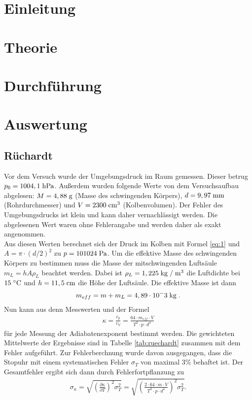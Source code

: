 \documentclass[12pt, a4paper, twoside]{scrartcl}
\begin{document}

\cleardoublepage
\tableofcontents
\cleardoublepage
\setcounter{page}{1}

\section{Einleitung}
\label{sec:einleitung}

\section{Theorie}
\label{sec:theorie}


\section{Durchführung}
\label{sec:durchfuehrung}

\section{Auswertung}
\label{sec:auswertung}

\subsection{Rüchardt}
Vor dem Versuch wurde der Umgebungsdruck im Raum gemessen. Dieser betrug $p_0=1004,1\hecto\pascal$. Außerdem wurden folgende Werte von dem Versuchsaufbau abgelesen: $M=4,88\gramm$ (Masse des schwingenden Körpers), $d=9,97\milli\meter$ (Rohrdurchmesser) und $V=2300\centi\meter^3$ (Kolbenvolumen). Der Fehler des Umgebungsdrucks ist klein und kann daher vernachlässigt werden. Die abgelesenen Wert waren ohne Fehlerangabe und werden daher als exakt angenommen.\\

Aus diesen Werten berechnet sich der Druck im Kolben mit Formel \ref{eq:1} und $A=\pi\cdot (d/2)^2$ zu $p=101024\pascal$. Um die effektive Masse des schwingenden Körpers zu bestimmen muss die Masse der mitschwingenden Luftsäule $m_L=hA\rho_L$ beachtet werden. Dabei ist $\rho_L=1,225\kilogramm/\meter^3$ die Luftdichte bei $15\degree\celsius$ und $h=11,5\centi\meter$ die Höhe der Luftsäule. Die effektive Masse ist dann
\begin{align*}
m_{eff}=m+m_L=4,89\cdot10^-3\kilogramm.
\end{align*}
Nun kann aus denn Messwerten und der Formel
\begin{align*}
\kappa=\frac{c_p}{c_V}=\frac{64\cdot m_{eff}\cdot V}{T^2\cdot p\cdot d^4}
\end{align*}
für jede Messung der Adiabatenexponent bestimmt werden. Die gewichteten Mittelwerte der Ergebnisse sind in Tabelle \ref{tab:ruechardt} zusammen mit dem Fehler aufgeführt. Zur Fehlerberchnung wurde davon ausgegangen, dass die Stopuhr mit einem systematischen Fehler $\sigma_T$ von maximal 3\% behaftet ist. Der Gesamtfehler ergibt sich dann durch Fehlerfortpflanzung zu
\begin{align*}
\sigma_\kappa=\sqrt{\left(\frac{\partial\kappa}{\partial T}\right)^2\sigma_T^2}=\sqrt{\left(\frac{2\cdot64\cdot m\cdot V}{T^3\cdot p \cdot d^4}\right)^2\sigma_T^2}.
\end{align*}
\end{document}
